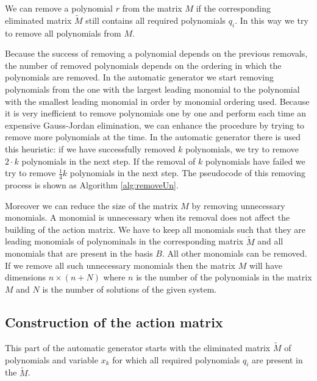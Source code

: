 We can remove a polynomial $r$ from the matrix $M$ if the corresponding eliminated matrix $\tilde{M}$ still contains all required polynomials $q_i$. In this way we try to remove all polynomials from $M$.

Because the success of removing a polynomial depends on the previous removals, the number of removed polynomials depends on the ordering in which the polynomials are removed. In the automatic generator we start removing polynomials from the one with the largest leading monomial to the polynomial with the smallest leading monomial in order by monomial ordering used. Because it is very inefficient to remove polynomials one by one and perform each time an expensive Gauss-Jordan elimination, we can enhance the procedure by trying to remove more polynomials at the time. In the automatic generator there is used this heuristic: if we have successfully removed $k$ polynomials, we try to remove $2\cdot k$ polynomials in the next step. If the removal of $k$ polynomials have failed we try to remove $\frac{1}{4}k$ polynomials in the next step. The pseudocode of this removing process is shown as Algorithm \ref{alg:removeUn}.



Moreover we can reduce the size of the matrix $M$ by removing unnecessary monomials. A monomial is unnecessary when its removal does not affect the building of the action matrix. We have to keep all monomials such that they are leading monomials of polynominals in the corresponding matrix $\tilde{M}$ and all monomials that are present in the basis $B$. All other monomials can be removed. If we remove all such unnecessary monomials then the matrix $M$ will have dimensions $n \times (n + N)$ where $n$ is the number of the polynomials in the matrix $M$ and $N$ is the number of solutions of the given system.

\subsection{Construction of the action matrix}
This part of the automatic generator starts with the eliminated matrix $\tilde{M}$ of polynomials and variable $x_k$ for which all required polynomials $q_i$ are present in the $\tilde{M}$.

